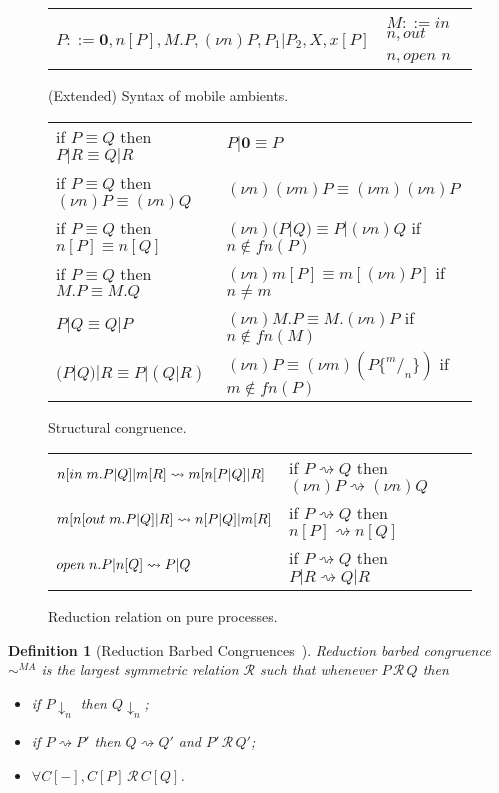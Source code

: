 \documentclass[copyright,creativecommons]{eptcs}
\newcommand{\nil}{\mathbf{0}}
\newcommand{\barb}[1]{\downarrow_{#1}}
\newcommand{\react}{\rightsquigarrow}
\newcommand{\<}{\langle}
\renewcommand{\>}{\rangle}
\newtheorem{definition}{Definition}{}
\begin{document}
\begin{figure}[!t]
\center
\begin{tabular}{p{7.3 cm} p{5 cm}}
\hline \\
$P::= \nil , n[P] , M.P , (\nu n)P , P_1 | P_2 , X , x[P]$ & $M::= in$ $n , out$ $n , open$ $n$ \bigskip\\
\hline
\end{tabular}
\caption{(Extended) Syntax of mobile ambients.}
\label{syntax}
\vspace{3mm}
\begin{tabular}{p{6 cm} p{6 cm}}
\hline
if $P \equiv Q$ then $P|R \equiv Q|R$ & $P|\nil \equiv P$\\
if $P \equiv Q$ then $(\nu n)P \equiv (\nu n)Q$ & $(\nu n)(\nu m)P \equiv (\nu m)(\nu n)P$\\
if $P \equiv Q$ then $n[P] \equiv n[Q]$ & $(\nu n)(P|Q) \equiv P|(\nu n)Q$ \hspace{3mm} if $n \notin fn(P)$\\
if $P \equiv Q$ then $M.P \equiv M.Q$ & $(\nu n) m[P] \equiv m[(\nu n)P]$ \hspace{3mm} if $n \ne m$\\
$P|Q \equiv Q|P$ & $(\nu n) M.P \equiv M.(\nu n)P$ \hspace{4mm} if $n \notin fn(M)$\\
$(P|Q)|R \equiv P|(Q|R)$ & $(\nu n) P \equiv (\nu m)(P\lbrace ^m/_n \rbrace)$ \hspace{.75mm}if $m \notin fn(P)$\\
\hline
\end{tabular}
\caption{Structural congruence.}
\label{cong}
\vspace{3mm}
\begin{tabular}{p{6 cm} p{6 cm}}
\hline
$n[in \hspace{1 mm} m.P|Q]|m[R] \react m[n[P|Q]|R]$ & if  $P \react Q$ then  $(\nu n)P \react (\nu n)Q$\\
$m[n[out \hspace{1 mm} m.P|Q]|R]\react n[P|Q]|m[R]$ & if  $P \react Q$  then  $n[P] \react n[Q]$ \\
$open \hspace{1 mm} n.P|n[Q] \react P|Q$ & if  $P \react Q$  then  $P|R \react Q|R$\\
\hline
\end{tabular}
\caption{Reduction relation on pure processes.}
\label{reduction}
\end{figure}

\begin{definition} [Reduction Barbed Congruences~\cite{PawelAmbient}]
\label{StrongCong}
\emph{Reduction barbed congruence} $\sim^{MA}$ is the largest symmetric relation $\mathcal R$ such that whenever
$P \, \mathcal R \, Q$ then
\begin{itemize}
\item if $P\barb{n}$ then $Q\barb{n}$;
\item if $P \react P'$ then $Q \react Q'$ and $P' \, \mathcal R \, Q'$;
\item $\forall C[-], C[P] \, \mathcal R \, C[Q]$.
\end{itemize}
\end{definition}
\end{document}

